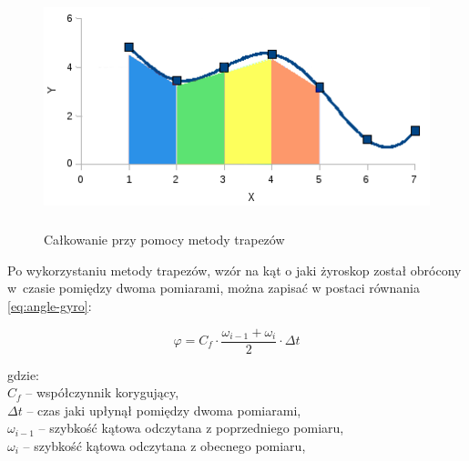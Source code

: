 \begin{figure}[h!]
 \centering
 \includegraphics[height=70mm]{../images/ch04/calkowanie-metoda-trapezow.png}
 \caption[Całkowanie przy pomocy metody trapezów]{Całkowanie przy pomocy metody trapezów\footnotemark}
 \label{fig:CalkowanieTrapezy}
\end{figure}

Po wykorzystaniu metody trapezów, wzór na kąt o jaki żyroskop został obrócony
w~czasie pomiędzy dwoma pomiarami, można zapisać w postaci równania \ref{eq:angle-gyro}:

\begin{equation}
 \label{eq:angle-gyro}
  \varphi = C_{f} \cdot \frac{\omega_{i-1} + \omega_{i}}{2} \cdot \Delta t
\end{equation}
\begin{tabbing}
  gdzie: \= \\
    \> $C_{f}$ -- współczynnik korygujący, \\
    \> $\Delta t$ -- czas jaki upłynął pomiędzy dwoma pomiarami,\\
    \> $\omega_{i-1}$ -- szybkość kątowa odczytana z poprzedniego pomiaru,\\
    \> $\omega_{i}$ -- szybkość kątowa odczytana z obecnego pomiaru,\\
\end{tabbing}

